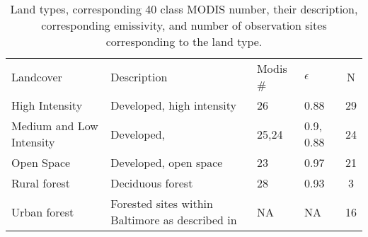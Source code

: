 \documentclass[draft,linenumbers]{agujournal}
\begin{document}
%
\begin{table}
\centering
\begin{tabular}{l l l l c}
Landcover & Description &  Modis \# & $\epsilon$ & N  \\
High Intensity & Developed, high intensity & 26& 0.88 & 29 \\
Medium and Low Intensity & Developed, & 25,24& 0.9, 0.88 & 24\\
Open Space& Developed, open space &23 & 0.97 &  21\\
Rural forest&Deciduous forest & 28& 0.93& 3\\
Urban forest& Forested sites within Baltimore as described in \cite{} &NA & NA & 16\\
\end{tabular}
\caption{Land types, corresponding 40 class MODIS number, their description, corresponding emissivity, and number of observation sites corresponding to the land type.}
\label{tab:lcc}
\end{table}
\end{document}
